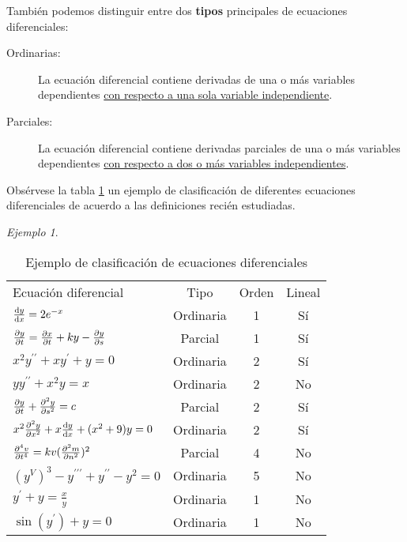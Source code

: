 \documentclass[12pt]{article} %
\theoremstyle{remark} %
\newtheorem{ejemplo}{Ejemplo}[section]
\begin{document}
También podemos distinguir entre dos \textbf{tipos} principales de ecuaciones diferenciales:
\begin{description}
  \item[Ordinarias:] La ecuación diferencial contiene derivadas de una o más variables dependientes 
    \underline{con respecto a una sola variable independiente}.
  \item[Parciales:] La ecuación diferencial contiene derivadas parciales de una o más variables dependientes
    \underline{con respecto a dos o más variables independientes}.
\end{description}

Obsérvese la tabla \ref{tab:EjemploClasificacion} un ejemplo de clasificación de diferentes ecuaciones diferenciales de acuerdo a las definiciones 
recién estudiadas.

\begin{ejemplo}
\begin{table}
  \centering
  \caption{Ejemplo de clasificación de ecuaciones diferenciales}
  \label{tab:EjemploClasificacion}
  \begin{tabular}{lccc}
    Ecuación diferencial & Tipo & Orden & Lineal \\[0.5em]
    $\dv{y}{x} = 2e^{-x}$ & Ordinaria & 1 & Sí \\[0.6em]
    $\pdv{y}{t} = \pdv{x}{t} + ky - \pdv{y}{s}$ & Parcial & 1 & Sí \\[0.6em]
    $x^2y^{\prime \prime} + xy^{\prime} + y = 0$ & Ordinaria & 2 & Sí \\[0.6em]
    $yy^{\prime \prime} + x^2y = x$ & Ordinaria & 2 & No \\[0.6em]
    $\pdv{y}{t} + \pdv[2]{y}{s} = c$ &Parcial & 2 & Sí \\[0.6em]
    $x^2 \pdv[2]{y}{x} + x \dv{y}{x} + (x^2 + 9)y = 0$ & Ordinaria & 2 & Sí \\[0.6em]
    $\pdv[4]{v}{t} = kv(\pdv[2]{m}{n})^2$ & Parcial & 4 & No \\[0.6em]
    $(y^V)^3 - y^{\prime \prime \prime} + y^{\prime \prime} - y^2 = 0$ & Ordinaria & 5 & No \\[0.6em]
    $y^{\prime} + y = \frac{x}{y}$ & Ordinaria & 1 & No \\[0.6em]
    $\sin (y^{\prime}) + y = 0$ & Ordinaria & 1 & No
  \end{tabular}
\end{table}
\end{ejemplo}
\end{document}
